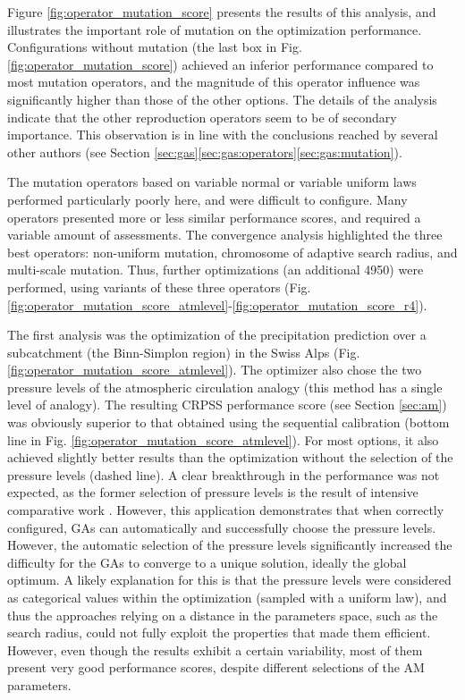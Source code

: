 \documentclass{ametsoc}
\begin{document}
Figure \ref{fig:operator_mutation_score} presents the results of this analysis, and illustrates the important role of mutation on the optimization performance. Configurations without mutation (the last box in Fig. \ref{fig:operator_mutation_score}) achieved an inferior performance compared to most mutation operators, and the magnitude of this operator influence was significantly higher than those of the other options. The details of the analysis \citep[see][]{Horton2012a} indicate that the other reproduction operators seem to be of secondary importance. This observation is in line with the conclusions reached by several other authors (see Section \ref{sec:gas}\ref{sec:gas:operators}\ref{sec:gas:mutation}).

The mutation operators based on variable normal or variable uniform laws performed particularly poorly here, and were difficult to configure. Many operators presented more or less similar performance scores, and required a variable amount of assessments. The convergence analysis \citep[see][]{Horton2012a} highlighted the three best operators: non-uniform mutation, chromosome of adaptive search radius, and multi-scale mutation. Thus, further optimizations (an additional 4950) were performed, using variants of these three operators (Fig. \ref{fig:operator_mutation_score_atmlevel}-\ref{fig:operator_mutation_score_r4}).

The first analysis was the optimization of the precipitation prediction over a subcatchment (the Binn-Simplon region) in the Swiss Alps (Fig. \ref{fig:operator_mutation_score_atmlevel}). The optimizer also chose the two pressure levels of the atmospheric circulation analogy (this method has a single level of analogy). The resulting CRPSS performance score (see Section \ref{sec:am}) was obviously superior to that obtained using the sequential calibration (bottom line in Fig. \ref{fig:operator_mutation_score_atmlevel}). For most options, it also achieved slightly better results than the optimization without the selection of the pressure levels (dashed line). A clear breakthrough in the performance was not expected, as the former selection of pressure levels is the result of intensive comparative work \citep{Bontron2004}. However, this application demonstrates that when correctly configured, GAs can automatically and successfully choose the pressure levels. However, the automatic selection of the pressure levels significantly increased the difficulty for the GAs to converge to a unique solution, ideally the global optimum. A likely explanation for this is that the pressure levels were considered as categorical values within the optimization (sampled with a uniform law), and thus the approaches relying on a distance in the parameters space, such as the search radius, could not fully exploit the properties that made them efficient. However, even though the results exhibit a certain variability, most of them present very good performance scores, despite different selections of the AM parameters.
\end{document}
